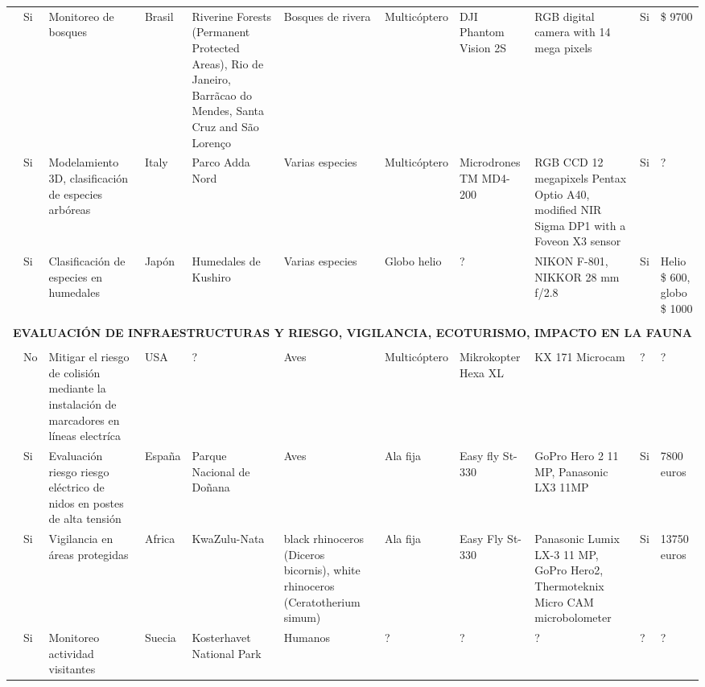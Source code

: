 \documentclass[]{interact}
\theoremstyle{plain}%
\theoremstyle{definition}
\theoremstyle{remark}
\begin{document}
\begin{landscape}
\begin{table}
\begin{tabular}{p{3cm}p{1.2cm}p{3cm}p{1cm}p{2cm}p{2cm}p{1cm}p{2cm}p{2cm}p{1cm}p{2cm}}
\cite{bustamante_forest_2015}  & Si &  Monitoreo de bosques & Brasil & Riverine Forests (Permanent Protected Areas), Rio de Janeiro, Barrãcao do Mendes, Santa Cruz and São Lorenço & Bosques de rivera & Multicóptero & DJI Phantom Vision 2S   & RGB digital camera with 14 mega pixels & Si & \$ 9700  \\ 
  
\cite{gini_aerial_2012}  & Si & Modelamiento 3D, clasificación de especies arbóreas & Italy & Parco Adda Nord &  Varias especies &  Multicóptero  &  Microdrones TM MD4-200 & RGB CCD 12 megapixels Pentax Optio A40, modified NIR Sigma DP1 with a Foveon X3 sensor  & Si & ?  \\

\cite{miyamoto_use_2004}& Si & Clasificación de especies en humedales & Japón & Humedales de Kushiro &  Varias especies & Globo helio  & ? & NIKON F-801, NIKKOR 28 mm f/2.8  & Si & Helio \$ 600, globo \$ 1000  \\ 

\multicolumn{11}{c}{} \\
\multicolumn{11}{c}{{\bf EVALUACIÓN DE INFRAESTRUCTURAS Y RIESGO, VIGILANCIA, ECOTURISMO, IMPACTO EN LA FAUNA }} \\
\multicolumn{11}{c}{} \\

\cite{lobermeier_mitigating_2015} & No  & Mitigar el riesgo de colisión mediante la instalación de marcadores en líneas electríca & USA & ?  & Aves  & Multicóptero  & Mikrokopter Hexa XL  & KX 171 Microcam & ? & ? \\ 

\cite{pazmany_low_2014a} & Si  & Evaluación riesgo riesgo eléctrico de nidos en postes de alta tensión & España & Parque Nacional de Doñana &  Aves  & Ala fija  & Easy fly St-330 & GoPro Hero 2 11 MP, Panasonic LX3 11MP & Si & 7800 euros  \\ 

\cite{mulero-pazmany_remotely_2014}  & Si  & Vigilancia en áreas protegidas & Africa & KwaZulu-Nata & black rhinoceros (Diceros bicornis), white rhinoceros (Ceratotherium simum)  & Ala fija  & Easy Fly St-330 & Panasonic Lumix LX-3 11 MP, GoPro Hero2, Thermoteknix Micro CAM microbolometer & Si & 13750 euros  \\ 

\cite{hansen_applying_2016} & Si  & Monitoreo actividad visitantes  & Suecia & Kosterhavet National Park &  Humanos  & ?  & ? & ?  & ? & ?  \\ 


\end{tabular}
\end{table}
\end{landscape}
\end{document}
